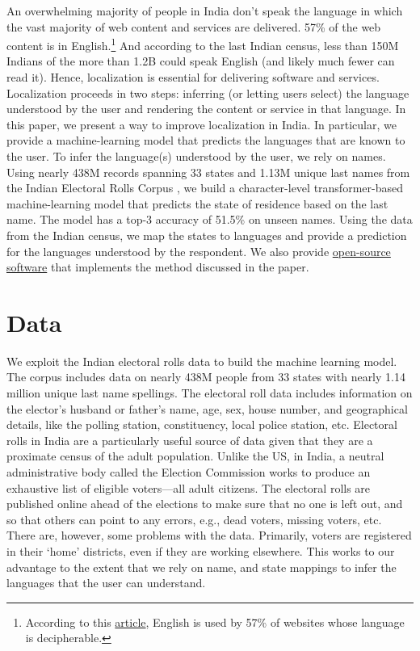 \documentclass[11pt,  letterpaper]{article}
\begin{document}
An overwhelming majority of people in India don’t speak the language in which the vast majority of web content and services are delivered. 57\% of the web content is in English.\footnote{According to this \href{https://w3techs.com/technologies/overview/content_language}{article}, English is used by 57\% of websites whose language is decipherable.} And according to the last Indian census, less than 150M Indians of the more than 1.2B could speak English (and likely much fewer can read it). Hence, localization is essential for delivering software and services. Localization proceeds in two steps: inferring (or letting users select) the language understood by the user and rendering the content or service in that language. In this paper, we present a way to improve localization in India. In particular, we provide a machine-learning model that predicts the languages that are known to the user. To infer the language(s) understood by the user, we rely on names. Using nearly 438M records spanning 33 states and 1.13M unique last names from the Indian Electoral Rolls Corpus \citep{DVN/OG47IV_2023}, we build a character-level transformer-based machine-learning model that predicts the state of residence based on the last name. The model has a top-3 accuracy of 51.5\%  on unseen names. Using the data from the Indian census, we map the states to languages and provide a prediction for the languages understood by the respondent. We also provide \href{https://github.com/in-rolls/instate}{open-source software} that implements the method discussed in the paper. 


\section{Data}

We exploit the Indian electoral rolls data \citep{DVN/OG47IV_2023, DVN/MUEGDT_2018} to build the machine learning model. The corpus includes data on nearly 438M people from 33 states with nearly 1.14 million unique last name spellings. The electoral roll data includes information on the elector's husband or father’s name, age, sex, house number, and geographical details, like the polling station, constituency, local police station, etc. Electoral rolls in India are a particularly useful source of data given that they are a proximate census of the adult population. Unlike the US, in India, a neutral administrative body called the Election Commission works to produce an exhaustive list of eligible voters—all adult citizens. The electoral rolls are published online ahead of the elections to make sure that no one is left out, and so that others can point to any errors, e.g., dead voters, missing voters, etc. There are, however, some problems with the data. Primarily, voters are registered in their `home’ districts, even if they are working elsewhere. This works to our advantage to the extent that we rely on name, and state mappings to infer the languages that the user can understand.
\end{document}
